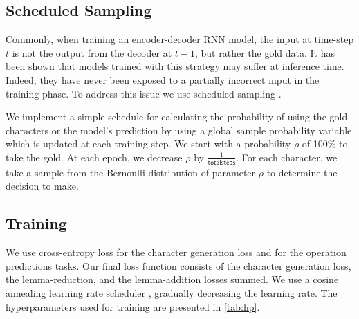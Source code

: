 \documentclass[11pt,a4paper]{article}
\newcommand\jp[1]{\textbf{JP: #1}}
\begin{document}


\subsection{Scheduled Sampling}

Commonly, when training an encoder-decoder RNN model, the input at
time-step $t$ is not the output from the decoder at $t-1$, but rather
the gold data.  It has been shown that models trained with this
strategy may suffer at inference time. Indeed, they have never been
exposed to a partially incorrect input in the training phase.  To
address this issue we use scheduled sampling
\cite{DBLP:conf/nips/BengioVJS15}.

We implement a simple schedule for calculating the probability of
using the gold characters or the model's prediction by using a global
sample probability variable which is updated at each training step. We
start with a probability \(\rho\) of 100\% to take the gold. At each
epoch, we decrease \(\rho\) by $\frac{1}{\mathsf{total steps}}$. For each
character, we take a sample from the Bernoulli distribution of
parameter \(\rho\) to determine the decision to make.

\subsection{Training}

We use cross-entropy loss for the character generation loss and 
for the operation predictions tasks. Our final loss function consists
of the character generation loss, the lemma-reduction, and the
lemma-addition losses summed. We use a cosine annealing learning rate
scheduler \cite{DBLP:conf/iclr/LoshchilovH17}, gradually decreasing
the learning rate. The hyperparameters used for training are presented
in \cref{tab:hp}.
\end{document}

